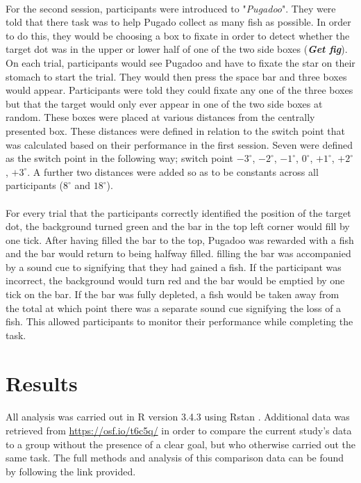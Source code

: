 \documentclass[12pt]{article}
\begin{document}
\paragraph{} For the second session, participants were introduced to "\textit{Pugadoo}". They were told that there task was to help Pugado collect as many fish as possible. In order to do this, they would be choosing a box to fixate in order to detect whether the target dot was in the upper or lower half of one of the two side boxes (\textit{\textbf{Get fig}}). On each trial, participants would see Pugadoo and have to fixate the star on their stomach to start the trial. They would then press the space bar and three boxes would appear. Participants were told they could fixate any one of the three boxes but that the target would only ever appear in one of the two side boxes at random. These boxes were placed at various distances from the centrally presented box. These distances were defined in relation to the switch point that was calculated based on their performance in the first session. Seven were defined as the switch point in the following way; switch point $-3^{\circ}$, $-2^{\circ}$, $-1^{\circ}$, $0^{\circ}$, $+1^{\circ}$, $+2^{\circ}$, $+3^{\circ}$. A further two distances were added so as to be constants across all participants ($8^{\circ}$ and $18^{\circ}$). 

\paragraph{} For every trial that the participants correctly identified the position of the target dot, the background turned green and the bar in the top left corner would fill by one tick. After having filled the bar to the top, Pugadoo was rewarded with a fish and the bar would return to being halfway filled. filling the bar was accompanied by a sound cue to signifying that they had gained a fish. If the participant was incorrect, the background would turn red and the bar would be emptied by one tick on the bar. If the bar was fully depleted, a fish would be taken away from the total at which point there was a separate sound cue signifying the loss of a fish. This allowed participants to monitor their performance while completing the task. 

\section*{Results}
\paragraph{} All analysis was carried out in R version 3.4.3 \citep{R} using Rstan \citep{Rstan,Stan}. Additional data was retrieved from \url{https://osf.io/t6c5q/} in order to compare the current study's data to a group without the presence of a clear goal, but who otherwise carried out the same task. The full methods and analysis of this comparison data can be found by following the link provided. 
\end{document}
